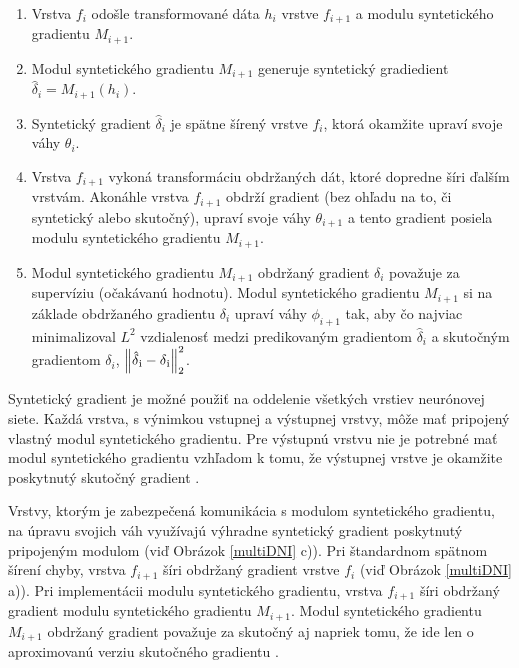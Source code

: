 \begin{enumerate}
    \item Vrstva $f_i$ odošle transformované dáta $h_i$ vrstve $f_{i+1}$ a modulu syntetického gradientu $M_{i+1}$.
    \item Modul syntetického gradientu $M_{i+1}$ generuje syntetický gradiedient $\hat{\delta}_i=M_{i+1}(h_i)$.
    \item Syntetický gradient $\hat{\delta}_i$ je spätne šírený vrstve $f_i$, ktorá okamžite upraví svoje váhy $\theta_i$.
    \item Vrstva $f_{i+1}$ vykoná transformáciu obdržaných dát, ktoré dopredne šíri ďalším vrstvám. Akonáhle vrstva $f_{i+1}$ obdrží gradient (bez ohľadu na to, či syntetický alebo skutočný), upraví svoje váhy $\theta_{i+1}$ a tento gradient posiela modulu syntetického gradientu $M_{i+1}$.
    \item Modul syntetického gradientu $M_{i+1}$ obdržaný gradient $\delta_i$ považuje za supervíziu (očakávanú hodnotu). Modul syntetického gradientu $M_{i+1}$ si na základe obdržaného gradientu $\delta_i$ upraví váhy $\phi_{i+1}$ tak, aby čo najviac minimalizoval $L^2$ vzdialenosť medzi predikovaným gradientom $\hat{\delta}_i$ a skutočným gradientom $\delta_i$, ${\left\Vert \hat{\delta}\textsubscript{i} - \delta\textsubscript{i}\right\Vert}_{2}^2$.
\end{enumerate}

Syntetický gradient je možné použiť na oddelenie všetkých vrstiev neurónovej siete. Každá vrstva, s výnimkou vstupnej a výstupnej vrstvy, môže mať pripojený vlastný modul syntetického gradientu. Pre výstupnú vrstvu nie je potrebné mať modul syntetického gradientu vzhľadom k tomu, že výstupnej vrstve je okamžite poskytnutý skutočný gradient \cite{Jaderberg2016}.

Vrstvy, ktorým je zabezpečená komunikácia s modulom syntetického gradientu, na úpravu svojich váh využívajú výhradne syntetický gradient poskytnutý pripojeným modulom (viď Obrázok \ref{multiDNI} c)). Pri štandardnom spätnom šírení chyby, vrstva $f_{i+1}$ šíri obdržaný gradient vrstve $f_i$ (viď Obrázok \ref{multiDNI} a)). Pri implementácii modulu syntetického gradientu, vrstva $f_{i+1}$ šíri obdržaný gradient modulu syntetického gradientu $M_{i+1}$. Modul syntetického gradientu $M_{i+1}$ obdržaný gradient považuje za skutočný aj napriek tomu, že ide len o aproximovanú verziu skutočného gradientu \cite{Jaderberg2016}.

